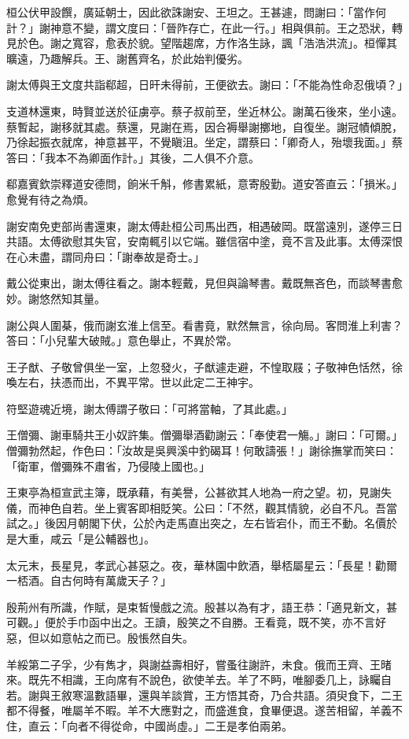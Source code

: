 桓公伏甲設饌，廣延朝士，因此欲誅謝安、王坦之。王甚遽，問謝曰：「當作何計？」謝神意不變，謂文度曰：「晉阼存亡，在此一行。」相與俱前。王之恐狀，轉見於色。謝之寬容，愈表於貌。望階趨席，方作洛生詠，諷「浩浩洪流」。桓憚其曠遠，乃趣解兵。王、謝舊齊名，於此始判優劣。

謝太傅與王文度共詣郗超，日旰未得前，王便欲去。謝曰：「不能為性命忍俄頃？」

支道林還東，時賢並送於征虜亭。蔡子叔前至，坐近林公。謝萬石後來，坐小遠。蔡暫起，謝移就其處。蔡還，見謝在焉，因合褥舉謝擲地，自復坐。謝冠幘傾脫，乃徐起振衣就席，神意甚平，不覺瞋沮。坐定，謂蔡曰：「卿奇人，殆壞我面。」蔡答曰：「我本不為卿面作計。」其後，二人俱不介意。

郗嘉賓欽崇釋道安德問，餉米千斛，修書累紙，意寄殷勤。道安答直云：「損米。」愈覺有待之為煩。

謝安南免吏部尚書還東，謝太傅赴桓公司馬出西，相遇破岡。既當遠別，遂停三日共語。太傅欲慰其失官，安南輒引以它端。雖信宿中塗，竟不言及此事。太傅深恨在心未盡，謂同舟曰：「謝奉故是奇士。」

戴公從東出，謝太傅往看之。謝本輕戴，見但與論琴書。戴既無吝色，而談琴書愈妙。謝悠然知其量。

謝公與人圍棊，俄而謝玄淮上信至。看書竟，默然無言，徐向局。客問淮上利害？答曰：「小兒輩大破賊。」意色舉止，不異於常。

王子猷、子敬曾俱坐一室，上忽發火，子猷遽走避，不惶取屐；子敬神色恬然，徐喚左右，扶憑而出，不異平常。世以此定二王神宇。

符堅遊魂近境，謝太傅謂子敬曰：「可將當軸，了其此處。」

王僧彌、謝車騎共王小奴許集。僧彌舉酒勸謝云：「奉使君一觴。」謝曰：「可爾。」僧彌勃然起，作色曰：「汝故是吳興溪中釣碣耳！何敢譸張！」謝徐撫掌而笑曰：「衛軍，僧彌殊不肅省，乃侵陵上國也。」

王東亭為桓宣武主簿，既承藉，有美譽，公甚欲其人地為一府之望。初，見謝失儀，而神色自若。坐上賓客即相貶笑。公曰：「不然，觀其情貌，必自不凡。吾當試之。」後因月朝閣下伏，公於內走馬直出突之，左右皆宕仆，而王不動。名價於是大重，咸云「是公輔器也」。

太元末，長星見，孝武心甚惡之。夜，華林園中飲酒，舉桮屬星云：「長星！勸爾一桮酒。自古何時有萬歲天子？」

殷荊州有所識，作賦，是束皙慢戲之流。殷甚以為有才，語王恭：「適見新文，甚可觀。」便於手巾函中出之。王讀，殷笑之不自勝。王看竟，既不笑，亦不言好惡，但以如意帖之而已。殷悵然自失。

羊綏第二子孚，少有雋才，與謝益壽相好，嘗蚤往謝許，未食。俄而王齊、王暏來。既先不相識，王向席有不說色，欲使羊去。羊了不眄，唯腳委几上，詠矚自若。謝與王敘寒溫數語畢，還與羊談賞，王方悟其奇，乃合共語。須臾食下，二王都不得餐，唯屬羊不暇。羊不大應對之，而盛進食，食畢便退。遂苦相留，羊義不住，直云：「向者不得從命，中國尚虛。」二王是孝伯兩弟。



